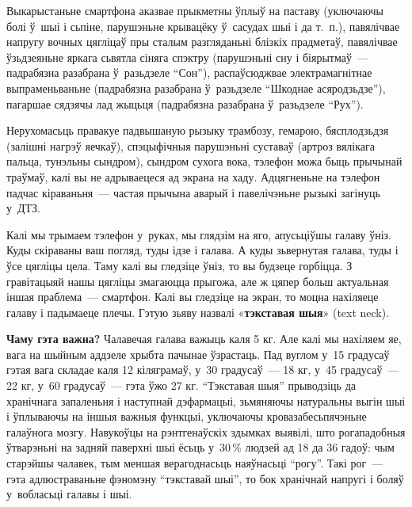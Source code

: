 Выкарыстаньне смартфона аказвае прыкметны ўплыў на паставу (уключаючы болі ў~шыі і сьпіне, парушэньне крывацёку ў~сасудах шыі і да т.~п.), павялічвае напругу вочных цягліцаў пры сталым разгляданьні блізкіх прадметаў, павялічвае ўзьдзеяньне яркага сьвятла сіняга спэктру (парушэньні сну і біярытмаў~--- падрабязна разабрана ў~разьдзеле ``Сон''), распаўсюджвае электрамагнітнае выпраменьваньне (падрабязна разабрана ў~разьдзеле ``Шкоднае асяродзьдзе''), пагаршае сядзячы лад жыцьця (падрабязна разабрана ў~разьдзеле ``Рух'').

Нерухомасьць правакуе падвышаную рызыку трамбозу, гемарою, бясплодзьдзя (залішні нагрэў яечкаў), спэцыфічныя парушэньні суставаў (артроз вялікага пальца, тунэльны сындром), сындром сухога вока, тэлефон можа быць прычынай траўмаў, калі вы не адрываецеся ад экрана на хаду. Адцягненьне на тэлефон падчас кіраваньня~--- частая прычына аварый і павелічэньне рызыкі загінуць у~ДТЗ.


Калі мы трымаем тэлефон у~руках, мы глядзім на яго, апусьціўшы галаву ўніз. Куды скіраваны ваш погляд, туды ідзе і галава. А куды зьвернутая галава, туды і ўсе цягліцы цела. Таму калі вы гледзіце ўніз, то вы будзеце горбіцца. З гравітацыяй нашы цягліцы змагаюцца прыгожа, але ж цяпер больш актуальная іншая праблема~--- смартфон. Калі вы гледзіце на экран, то моцна нахіляеце галаву і падымаеце плечы. Гэтую зьяву назвалі «\textbf{тэкставая шыя}» (text neck).

\textbf{Чаму гэта важна?} Чалавечая галава важыць каля 5 кг. Але калі мы нахіляем яе, вага на шыйным аддзеле хрыбта пачынае ўзрастаць. Пад вуглом у~15 градусаў гэтая вага складае каля 12 кіляграмаў, у~30 градусаў~--- 18 кг, у~45 градусаў~--- 22 кг, у~60 градусаў~--- гэта ўжо 27 кг. ``Тэкставая шыя'' прыводзіць да хранічнага запаленьня і наступнай дэфармацыі, зьмяняючы натуральны выгін шыі і ўплываючы на іншыя важныя функцыі, уключаючы кровазабесьпячэньне галаўнога мозгу. Навукоўцы на рэнтгенаўскіх здымках выявілі, што рогападобныя ўтварэньні на задняй паверхні шыі ёсьць у~30\,\% людзей ад 18 да 36 гадоў: чым старэйшы чалавек, тым меншая верагоднасьць наяўнасьці ``рогу''. Такі рог~--- гэта адлюстраваньне фэномэну ``тэкставай шыі'', то бок хранічнай напругі і боляў у~вобласьці галавы і шыі.

